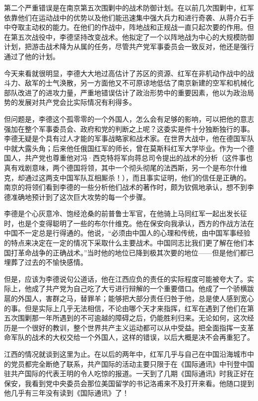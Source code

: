 \documentclass[10pt]{book}
\begin{document}
第二个严重错误是在南京第五次围剿中的战术防御计划。在以前几次围剿中，红军依靠他们在运动战中的优势以及他们能迅速集中强大兵力和进行奇袭、从蒋介石手中夺取主动权的能力。在他们的作战中，阵地战和正规战一直只起次要的作用。但在第五次战役中，李德坚持改变战术。他拟定了一个以阵地战为中心的大规模防御计划，把游击战术降为从属的任务，尽管共产党军事委员会一致反对，他还是强行通过了他的计划。

今天来看就很明显，李德大大地过高估计了苏区的资源、红军在非机动作战中的战斗力、敌军的士气涣散，另一方面他又不可原谅地低估了南京新建的空军和机械化部队改进了的进攻力量，严重地错误估计了政治形势中的重要因素，他以为政治局势的发展对共产党会比实际情况有利得多。

但问题是，李德这个孤零零的一个外国人，怎么会有足够的影响，可以把他的意志强加在整个军事委员会、政府和党的判断之上呢？这委实是件十分独断独行的事。李德无疑是个具有过人才能的军事战略家和战术家。在世界大战中，他在德国军队中就大露头角；后来他任俄国红军的师长，曾在莫斯科红军大学毕业。作为一个德国人，共产党也尊重他对冯·西克特将军向蒋总司令提出的战术的分析（这件事也真有戏剧意味，两个德国将领，其中一个彻头彻尾的法西斯，另一个是布尔什维克，却通过这两支中国军队互相厮杀！），而且事实证明，他们的信任是正确的。南京的将领们看到李德的一些分析他们战术的著作时，颇为钦佩地承认，想不到李德准确地预计到了这次巨大攻势的每一个步骤。

李德是个心灰意冷、饱经沧桑的前普鲁士军官，在他骑上马同红军一起出发长征时，也是个变得聪明了一些的布尔什维克。他在保安向我承认，西方的作战方法在中国不一定总是行得通的。他说，“必须由中国人的心理和传统，由中国军事经验的特点来决定在一定的情况下采取什么主要战术。中国同志比我们更了解在他们本国打革命战争的正确战术。”当时他的地位已降到极其次要的地位——但是他们都已埋葬了过去的不愉快感情。

但是，应该为李德说句公道话，他在江西应负的责任的实际程度可能被夸大了。实际上，他成了共产党为自己吃了大亏进行辩解的一个重要借口。他成了一个骄横跋扈的外国人，害群之马，替罪羊；能够把大部分责任归咎于他，总是使人感到宽心的事。但是实际上几乎无法相信，不论由哪个天才来指挥，红军在遇到了他们在第五次围剿那一年所遇到的不可逾越的障碍之后，仍能胜利归来。无论如何，这次经历是一个很好的教训，整个世界共产主义运动都可以从中受益。把全面指挥一支革命军队的战术的大权交给一个外国人，这样的错误，以后大概是决不会再重犯了。

江西的情况就谈到这里为止。在以后的两年中，红军几乎与自己在中国沿海城市中的党员都完全断绝了联系，共产国际的活动主要只限于在《国际通讯》中刊登中国驻共产国际的代表王明的令人吃惊的报道。一天到了几期《国际通讯》时我正好在保安，我看到党中央委员会那位美国留学的书记洛甫来不及打开来看。他随口提到他几乎有三年没有读到《国际通讯》了！
\end{document}
